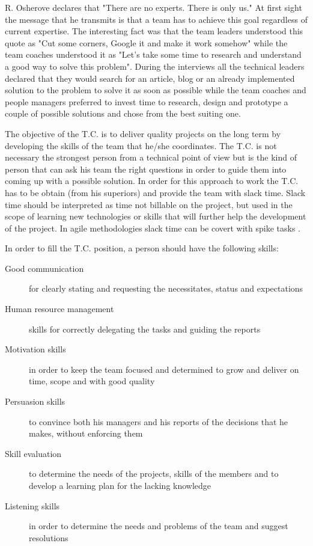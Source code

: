 R. Osherove \cite{notes-to-a-software-team-leader} declares that "There are no experts. There is only us." At first sight the message that he transmits is that a team has to achieve this goal regardless of current expertise. The interesting fact was that the team leaders understood this quote as "Cut some corners, Google it and make it work somehow" while the team coaches understood it as "Let's take some time to research and understand a good way to solve this problem". During the interviews all the technical leaders declared that they would search for an article, blog or an already implemented solution to the problem to solve it as soon as possible while the team coaches and people managers preferred to invest time to research, design and prototype a couple of possible solutions and chose from the best suiting one.

The objective of the T.C. is to deliver quality projects on the long term by developing the skills of the team that he/she coordinates. The T.C. is not necessary the strongest person from a technical point of view but is the kind of person that can ask his team the right questions in order to guide them into coming up with a possible solution.  In order for this approach to work the T.C. has to be obtain (from his superiors) and provide the team with slack time. Slack time should be interpreted as time not billable on the project, but used in the scope of learning new technologies or skills that will further help the development of the project. In agile methodologies slack time can be covert with spike tasks \cite{spike}.

In order to fill the T.C. position, a person should have the following skills:
\begin{description}
\item [Good communication] for clearly stating and requesting the necessitates, status and expectations
\item [Human resource management] skills for correctly delegating the tasks and guiding the reports
\item [Motivation skills] in order to keep the team focused and determined to grow and deliver on time, scope and with good quality
\item [Persuasion skills] to convince both his managers and his reports of the decisions that he makes, without enforcing them
\item [Skill evaluation] to determine the needs of the projects, skills of the members and to develop a learning plan for the lacking knowledge
\item [Listening skills] in order to determine the needs and problems of the team and suggest resolutions
\end{description}

